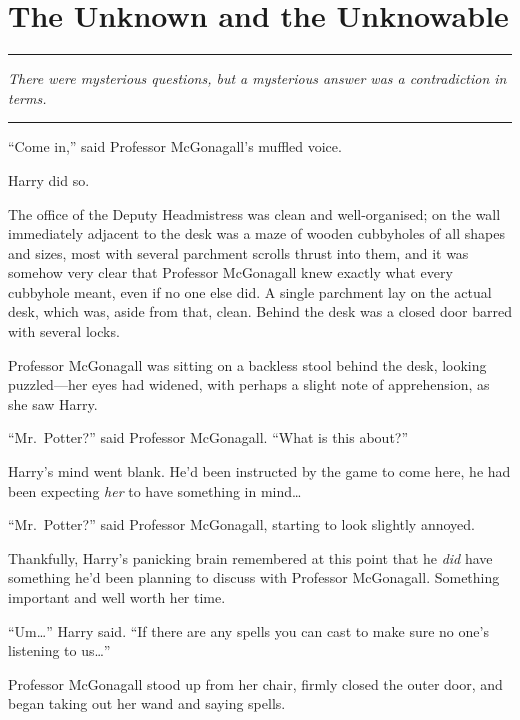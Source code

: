\chapter{The Unknown and the
Unknowable}\label{the-unknown-and-the-unknowable}

\begin{center}\rule{3in}{0.4pt}\end{center}

\emph{There were mysterious questions, but a mysterious answer was a
contradiction in terms.}

\begin{center}\rule{3in}{0.4pt}\end{center}

``Come in,'' said Professor McGonagall's muffled voice.

Harry did so.

The office of the Deputy Headmistress was clean and well-organised; on
the wall immediately adjacent to the desk was a maze of wooden
cubbyholes of all shapes and sizes, most with several parchment scrolls
thrust into them, and it was somehow very clear that Professor
McGonagall knew exactly what every cubbyhole meant, even if no one else
did. A single parchment lay on the actual desk, which was, aside from
that, clean. Behind the desk was a closed door barred with several
locks.

Professor McGonagall was sitting on a backless stool behind the desk,
looking puzzled---her eyes had widened, with perhaps a slight note of
apprehension, as she saw Harry.

``Mr.~Potter?'' said Professor McGonagall. ``What is this about?''

Harry's mind went blank. He'd been instructed by the game to come here,
he had been expecting \emph{her} to have something in mind\ldots{}

``Mr.~Potter?'' said Professor McGonagall, starting to look slightly
annoyed.

Thankfully, Harry's panicking brain remembered at this point that he
\emph{did} have something he'd been planning to discuss with Professor
McGonagall. Something important and well worth her time.

``Um\ldots{}'' Harry said. ``If there are any spells you can cast to
make sure no one's listening to us\ldots{}''

Professor McGonagall stood up from her chair, firmly closed the outer
door, and began taking out her wand and saying spells.

